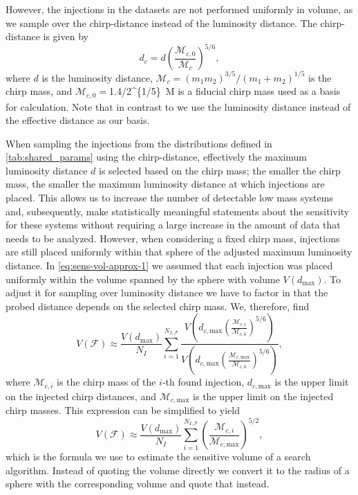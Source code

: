 However, the injections in the datasets are not performed uniformly in volume, as we sample over the chirp-distance instead of the luminosity distance. The chirp-distance is given by~\cite{LIGOScientific:2007npa}
\begin{equation}
    d_c = d{\left(\frac{\mathcal{M}_{c,0}}{\mathcal{M}_c}\right)}^{5/6},
\end{equation}
where $d$ is the luminosity distance, $\mathcal{M}_c = {\left(m_1 m_2\right)}^{3/5} / {\left(m_1 + m_2\right)}^{1/5}$ is the chirp mass, and $\mathcal{M}_{c,0} = $\SI[parse-numbers=false]{1.4/2^{1/5}}{M_\odot} is a fiducial chirp mass used as a basis for calculation. Note that in contrast to \cite{LIGOScientific:2007npa} we use the luminosity distance instead of the effective distance as our basis.

When sampling the injections from the distributions defined in \autoref{tab:shared_params} using the chirp-distance, effectively the maximum luminosity distance $d$ is selected based on the chirp mass; the smaller the chirp mass, the smaller the maximum luminosity distance at which injections are placed. This allows us to increase the number of detectable low mass systems and, subsequently, make statistically meaningful statements about the sensitivity for these systems without requiring a large increase in the amount of data that needs to be analyzed. However, when considering a fixed chirp mass, injections are still placed uniformly within that sphere of the adjusted maximum luminosity distance. In \autoref{eq:sens-vol-approx-1} we assumed that each injection was placed uniformly within the volume spanned by the sphere with volume $V\left(d_\text{max}\right)$. To adjust it for sampling over luminosity distance we have to factor in that the probed distance depends on the selected chirp mass. We, therefore, find
\begin{equation}
     V\left(\mathcal{F}\right)\approx \frac{V\left(d_\text{max}\right)}{N_I}\sum_{i=1}^{N_{I,\mathcal{F}}} \frac{V\left(d_{c,\text{max}} {\left(\frac{\mathcal{M}_{c, i}}{\mathcal{M}_{c,0}}\right)}^{5/6}\right)}{V\left(d_{c,\text{max}} {\left(\frac{\mathcal{M}_{c, \text{max}}}{\mathcal{M}_{c,0}}\right)}^{5/6}\right)},
\end{equation}
where $\mathcal{M}_{c,i}$ is the chirp mass of the $i$-th found injection, $d_{c,\text{max}}$ is the upper limit on the injected chirp distances, and $\mathcal{M}_{c,\text{max}}$ is the upper limit on the injected chirp masses. This expression can be simplified to yield
\begin{equation}
     V\left(\mathcal{F}\right)\approx \frac{V\left(d_\text{max}\right)}{N_I}\sum_{i=1}^{N_{I,\mathcal{F}}} {\left(\frac{\mathcal{M}_{c, i}}{\mathcal{M}_{c, \text{max}}}\right)}^{5/2},
\end{equation}
which is the formula we use to estimate the sensitive volume of a search algorithm. Instead of quoting the volume directly we convert it to the radius of a sphere with the corresponding volume and quote that instead.

